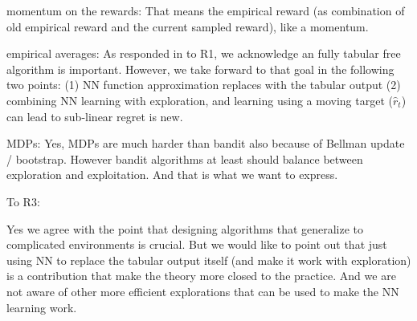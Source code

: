 \documentclass{article}
\begin{document}
momentum on the rewards: That means the empirical reward (as combination of old empirical reward and the current sampled reward), like a momentum.

empirical averages: As responded in to R1, we acknowledge an fully tabular free algorithm is important. However, we take forward to that goal in the following two points: (1) NN function approximation replaces with the tabular output (2) combining NN learning with exploration, and learning using a moving target ($\hat{r}_t$) can lead to sub-linear regret is new.

MDPs: Yes, MDPs are much harder than bandit also because of Bellman update / bootstrap. However bandit algorithms at least should balance between exploration and exploitation. And that is what we want to express.

To R3:

Yes we agree with the point that designing algorithms that generalize to complicated environments is crucial. But we would like to point out that just using NN to replace the tabular output itself (and make it work with exploration) is a contribution that make the theory more closed to the practice. And we are not aware of other more efficient explorations that can be used to make the NN learning work.
\end{document}
